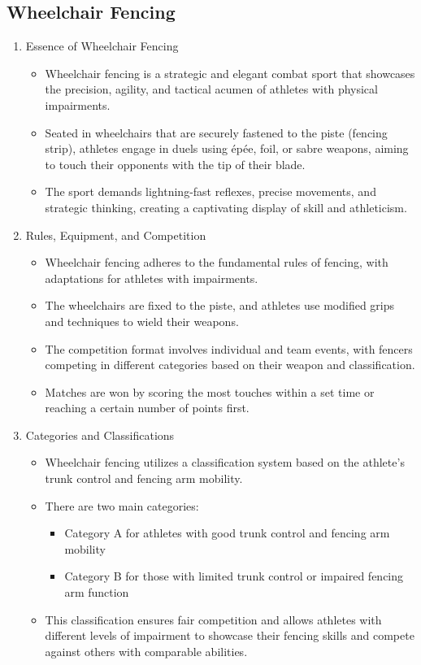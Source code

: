 \subsection{Wheelchair Fencing}

\begin{enumerate}

\item Essence of Wheelchair Fencing
    \begin{itemize}
    \item Wheelchair fencing is a strategic and elegant combat sport that showcases the precision, agility, and tactical acumen of athletes with physical impairments. 
    \item Seated in wheelchairs that are securely fastened to the piste (fencing strip), athletes engage in duels using épée, foil, or sabre weapons, aiming to touch their opponents with the tip of their blade. 
    \item The sport demands lightning-fast reflexes, precise movements, and strategic thinking, creating a captivating display of skill and athleticism.
    \end{itemize}

\item Rules, Equipment, and Competition
    \begin{itemize}
    \item Wheelchair fencing adheres to the fundamental rules of fencing, with adaptations for athletes with impairments. 
    \item The wheelchairs are fixed to the piste, and athletes use modified grips and techniques to wield their weapons. 
    \item The competition format involves individual and team events, with fencers competing in different categories based on their weapon and classification. 
    \item Matches are won by scoring the most touches within a set time or reaching a certain number of points first.
    \end{itemize}

\item Categories and Classifications
    \begin{itemize}
    \item Wheelchair fencing utilizes a classification system based on the athlete's trunk control and fencing arm mobility. 
    \item There are two main categories: 
        \begin{itemize}
        \item Category A for athletes with good trunk control and fencing arm mobility
        \item Category B for those with limited trunk control or impaired fencing arm function
        \end{itemize} 
    \item This classification ensures fair competition and allows athletes with different levels of impairment to showcase their fencing skills and compete against others with comparable abilities.
    \end{itemize}


\end{enumerate}
